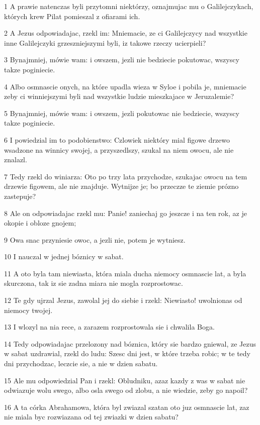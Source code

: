 \par 1 A prawie natenczas byli przytomni niektórzy, oznajmujac mu o Galilejczykach, których krew Pilat pomieszal z ofiarami ich.
\par 2 A Jezus odpowiadajac, rzekl im: Mniemacie, ze ci Galilejczycy nad wszystkie inne Galilejczyki grzeszniejszymi byli, iz takowe rzeczy ucierpieli?
\par 3 Bynajmniej, mówie wam: i owszem, jezli nie bedziecie pokutowac, wszyscy takze poginiecie.
\par 4 Albo osmnascie onych, na które upadla wieza w Syloe i pobila je, mniemacie zeby ci winniejszymi byli nad wszystkie ludzie mieszkajace w Jeruzalemie?
\par 5 Bynajmniej, mówie wam: i owszem, jezli pokutowac nie bedziecie, wszyscy takze poginiecie.
\par 6 I powiedzial im to podobienstwo: Czlowiek niektóry mial figowe drzewo wsadzone na winnicy swojej, a przyszedlszy, szukal na niem owocu, ale nie znalazl.
\par 7 Tedy rzekl do winiarza: Oto po trzy lata przychodze, szukajac owocu na tem drzewie figowem, ale nie znajduje. Wytnijze je; bo przeczze te ziemie prózno zastepuje?
\par 8 Ale on odpowiadajac rzekl mu: Panie! zaniechaj go jeszcze i na ten rok, az je okopie i obloze gnojem;
\par 9 Owa snac przyniesie owoc, a jezli nie, potem je wytniesz.
\par 10 I nauczal w jednej bóznicy w sabat.
\par 11 A oto byla tam niewiasta, która miala ducha niemocy osmnascie lat, a byla skurczona, tak iz sie zadna miara nie mogla rozprostowac.
\par 12 Te gdy ujrzal Jezus, zawolal jej do siebie i rzekl: Niewiasto! uwolnionas od niemocy twojej.
\par 13 I wlozyl na nia rece, a zarazem rozprostowala sie i chwalila Boga.
\par 14 Tedy odpowiadajac przelozony nad bóznica, który sie bardzo gniewal, ze Jezus w sabat uzdrawial, rzekl do ludu: Szesc dni jest, w które trzeba robic; w te tedy dni przychodzac, leczcie sie, a nie w dzien sabatu.
\par 15 Ale mu odpowiedzial Pan i rzekl: Obludniku, azaz kazdy z was w sabat nie odwiazuje wolu swego, albo osla swego od zlobu, a nie wiedzie, zeby go napoil?
\par 16 A ta córka Abrahamowa, która byl zwiazal szatan oto juz osmnascie lat, zaz nie miala byc rozwiazana od tej zwiazki w dzien sabatu?
